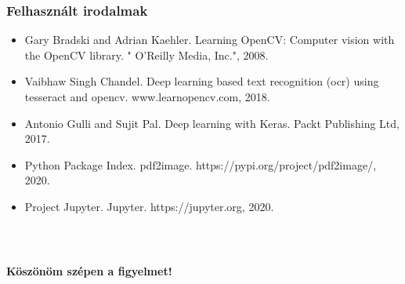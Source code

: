 \documentclass{beamer}
\begin{document}
\begin{frame}[fragile]
\frametitle{Felhasznált irodalmak}

\begin{itemize}
    \item Gary Bradski and Adrian Kaehler. Learning OpenCV: Computer vision with the OpenCV library. " O’Reilly Media, Inc.", 2008.
    \item Vaibhaw Singh Chandel. Deep learning based text recognition (ocr) using tesseract and opencv. www.learnopencv.com, 2018.
    \item Antonio Gulli and Sujit Pal. Deep learning with Keras. Packt Publishing Ltd, 2017.
    \item Python Package Index. pdf2image. https://pypi.org/project/pdf2image/, 2020.
    \item Project Jupyter. Jupyter. https://jupyter.org, 2020.
\end{itemize}


\end{frame}

\begin{frame}[fragile]
\frametitle{\ }

\begin{center}

    \Large

    \textbf{Köszönöm szépen a figyelmet!}

    \bigskip

\end{center}

\end{frame}
\end{document}
